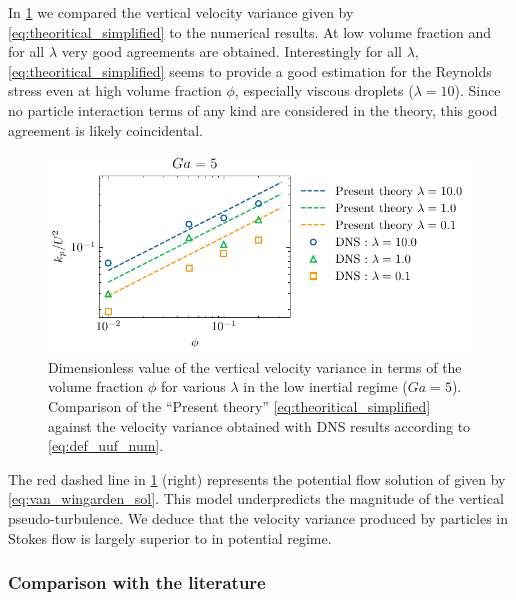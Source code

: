 In \ref{fig:uuyy} we compared the vertical velocity variance given by \ref{eq:theoritical_simplified} to the numerical results.
At low volume fraction and for all $\lambda$ very good agreements are obtained. 
Interestingly for all $\lambda$, \ref{eq:theoritical_simplified} seems to provide a good estimation for the Reynolds stress even at high volume fraction $\phi$, especially viscous droplets ($\lambda = 10$). 
Since no particle interaction terms of any kind are considered in the theory, this good agreement is likely coincidental.
\begin{figure}
    \centering
    \includegraphics[height = 0.25\textwidth]{image/HOMOGENEOUS_final/CA/UUyy_Ga_5.pdf}
    \caption{Dimensionless value of the vertical velocity variance  in terms of the volume fraction $\phi$ for various $\lambda$ in the low inertial regime ($Ga = 5$). 
    Comparison of the ``Present theory'' \eqref{eq:theoritical_simplified} against the velocity variance obtained with DNS results according to \eqref{eq:def_uuf_num}. 
    }
    \label{fig:uuyy}
\end{figure}
The red dashed line in \ref{fig:uuyy} (right) represents the potential flow solution of \citet{van1998pseudo} given by \ref{eq:van_wingarden_sol}. 
This model underpredicts the magnitude of the vertical pseudo-turbulence.
We deduce that the velocity variance produced by particles in Stokes flow is largely superior to in potential regime. 


\subsubsection{Comparison with the literature}

